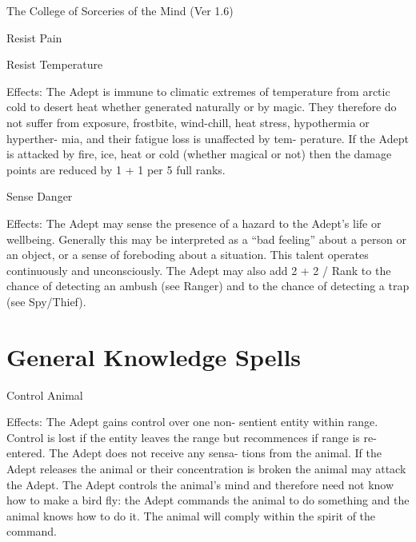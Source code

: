 \begin{Chapter}{The College of Sorceries of the Mind (Ver 1.6)}
\begin{talent}[T-1]{Resist Pain }
\end{talent}

\begin{talent}[T-2]{Resist Temperature }

Effects: The Adept is immune to climatic extremes 
of  temperature  from  arctic  cold  to  desert  heat 
whether  generated  naturally  or  by  magic.  They 
therefore  do  not  suffer  from  exposure,  frostbite, 
wind-chill,  heat  stress,  hypothermia  or  hyperther-
mia,  and  their  fatigue  loss  is  unaffected  by  tem-
perature.  If  the  Adept  is  attacked by  fire,  ice,  heat 
or  cold  (whether  magical  or  not)  then  the  damage 
points are reduced by 1 + 1 per 5 full ranks. 

\end{talent}

\begin{talent}[T-3]{Sense Danger }

Effects:  The  Adept  may  sense  the  presence  of  a 
hazard  to  the  Adept’s  life  or  wellbeing.  Generally 
this  may  be  interpreted  as  a  “bad  feeling”  about  a 
person or an object, or a sense of foreboding about 
a  situation.  This  talent  operates  continuously  and 
unconsciously.  The  Adept  may  also  add  2  +  2  / 
Rank  to  the  chance  of  detecting  an  ambush  (see 
Ranger)  and  to  the  chance  of  detecting  a  trap  (see 
Spy/Thief). 

\end{talent}

\section{General Knowledge Spells}

\begin{spell}[G-1]{Control Animal }

Effects:  The  Adept  gains  control  over  one  non-
sentient  entity  within  range.  Control  is  lost  if  the 
entity leaves the range but recommences if range is 
re-entered.  The  Adept  does  not  receive  any  sensa-
tions  from  the  animal.  If  the  Adept  releases  the 
animal  or  their  concentration  is  broken  the  animal 
may  attack  the  Adept.  The  Adept  controls  the 
animal’s mind and therefore need not know how to 
make a bird fly: the Adept commands the animal to 
do  something  and  the  animal  knows  how  to  do  it. 
The  animal  will  comply  within  the  spirit  of  the 
command. 


\end{spell}
\end{Chapter}
